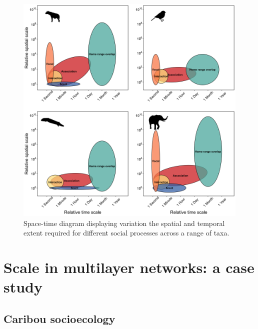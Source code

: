 \documentclass[]{article}
\begin{document}
\begin{figure}
\includegraphics[width=\linewidth]{../graphics/figure1} \caption{Space-time diagram displaying variation the spatial and temporal extent required for different social processes across a range of taxa.}\label{fig:unnamed-chunk-1}
\end{figure}

\hypertarget{scale-in-multilayer-networks-a-case-study}{%
\section{Scale in multilayer networks: a case study}\label{scale-in-multilayer-networks-a-case-study}}

\hypertarget{caribou-socioecology}{%
\subsection{Caribou socioecology}\label{caribou-socioecology}}
\end{document}
